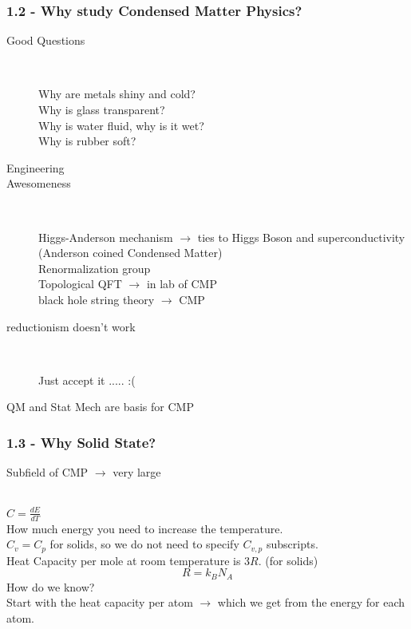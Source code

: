 \documentclass[english, 11pt]{article}
\begin{document}
			\subsubsection{1.2 - Why study Condensed Matter Physics?}
				\begin{description}
					\item[Good Questions] \

						Why are metals shiny and cold? \\
						Why is glass transparent? \\
						Why is water fluid, why is it wet? \\
						Why is rubber soft?\\
					\item[Engineering] 
		
					\item[Awesomeness] \

						Higgs-Anderson mechanism $\rightarrow$ ties to Higgs Boson and superconductivity (Anderson coined Condensed Matter) \\
						Renormalization group \\
						Topological QFT $\rightarrow$ in lab of CMP \\
						black hole string theory $\rightarrow$ CMP
					\item[reductionism doesn't work] \

						Just accept it ..... :(
					\item[QM and Stat Mech are basis for CMP] 
				\end{description}
				
			\subsubsection{1.3 - Why Solid State?}
				Subfield of CMP $\rightarrow$ very large
	
		\pagebreak

		 \\
		$C = \frac{dE}{dT}$ \\
		How much energy you need to increase the temperature.\\
		$C_v = C_p$ for solids, so we do not need to specify $C_{v,p}$ subscripts.\\
		Heat Capacity per mole at room temperature is $3R$. (for solids) \\
		\begin{equation*}
			R = k_B N_A
		\end{equation*}
		How do we know? \\
		Start with the heat capacity per atom $\rightarrow$ which we get from the energy for each atom. \\
		
\end{document}
